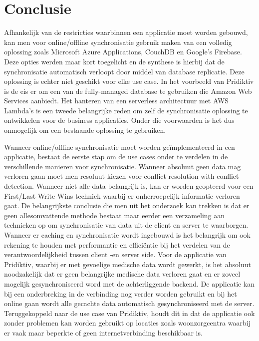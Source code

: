 
\chapter{Conclusie}
\label{ch:conclusie}


Afhankelijk van de restricties waarbinnen een applicatie moet worden gebouwd, kan men voor online/offline synchronisatie gebruik maken van een volledig oplossing zoals Microsoft Azure Applications, CouchDB en Google's Firebase. Deze opties werden maar kort toegelicht en de synthese is hierbij dat de synchronisatie automatisch verloopt door middel van database replicatie. Deze oplossing is echter niet geschikt voor elke use case. In het voorbeeld van Pridiktiv is de eis er om een van de fully-managed database te gebruiken die Amazon Web Services aanbiedt. Het hanteren van een serverless architectuur met AWS Lambda's is een tweede belangrijke reden om zelf de synchronisatie oplossing te ontwikkelen voor de business applicaties. Onder die voorwaarden is het dus onmogelijk om een bestaande oplossing te gebruiken.

Wanneer online/offline synchronisatie moet worden ge\"implementeerd in een applicatie,  bestaat de eerste stap om de use cases onder te verdelen in de verschillende manieren voor synchronisatie. Wanneer absoluut geen data mag verloren gaan moet men resoluut kiezen voor conflict resolution with conflict detection. Wanneer niet alle data belangrijk is, kan er worden geopteerd voor een First/Last Write Wins techniek waarbij er onherroepelijk informatie verloren gaat. De belangrijkste conclusie die men uit het onderzoek kan trekken is dat er geen allesomvattende methode bestaat maar eerder een verzameling aan technieken op om synchronisatie van data uit de client en server te waarborgen. Wanneer er caching en synchronisatie wordt ingebouwd is het belangrijk om ook rekening te houden met performantie en effici\"entie bij het verdelen van de verantwoordelijkheid tussen client -en server side. Voor de applicatie van Pridiktiv, waarbij er met gevoelige medische data wordt gewerkt, is het absoluut noodzakelijk dat er geen belangrijke medische data verloren gaat en er zoveel mogelijk gesynchroniseerd word met de achterliggende backend.
\clearpage
De applicatie kan bij een onderbreking in de verbinding nog verder worden gebruikt en bij het online gaan wordt alle gecachte data automatisch gesynchroniseerd met de server. Teruggekoppeld naar de use case van Pridiktiv, houdt dit in dat de applicatie ook zonder problemen kan worden gebruikt op locaties zoals woonzorgcentra waarbij er vaak maar beperkte of geen internetverbinding beschikbaar is.

